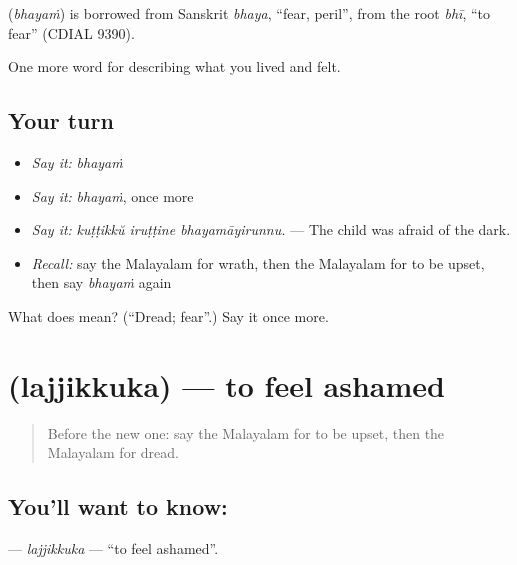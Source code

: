 \begin{cousinweb}
\textbf{} (\emph{bhayaṁ}) is borrowed from Sanskrit \emph{bhaya}, \textquotedblleft{}fear, peril\textquotedblright{}, from the root \emph{bhī}, \textquotedblleft{}to fear\textquotedblright{} (CDIAL 9390).
\end{cousinweb}

\begin{grammarlens}[title={What you've built}]
One more word for describing what you lived and felt.
\end{grammarlens}

\subsection*{Your turn}
\begin{itemize}
\raggedright
  \item \emph{Say it:} \emph{bhayaṁ}
  \item \emph{Say it:} \emph{bhayaṁ}, once more
  \item \emph{Say it:} \emph{kuṭṭikkŭ iruṭṭine bhayamāyirunnu.} — The child was afraid of the dark.
  \item \emph{Recall:} say the Malayalam for wrath, then the Malayalam for to be upset, then say \emph{bhayaṁ} again
\end{itemize}

\begin{tcolorbox}[breakable,colback=teal!4,colframe=teal!35!black,title={Before you move on}]
What does  mean? (\textquotedblleft{}Dread; fear\textquotedblright{}.) Say it once more.
\end{tcolorbox}
\section[\texorpdfstring{\ml{ലജ്ജിക്കുക} (lajjikkuka)}{ലജ്ജിക്കുക (lajjikkuka)}]{ (lajjikkuka) — to feel ashamed}

\label{lesson:ML-C518-lajjikkuka}



\begin{quote}
Before the new one: say the Malayalam for to be upset, then the Malayalam for dread.
\end{quote}

\subsection*{You'll want to know: }
\textbf{} — \emph{lajjikkuka} — \textquotedblleft{}to feel ashamed\textquotedblright{}.

